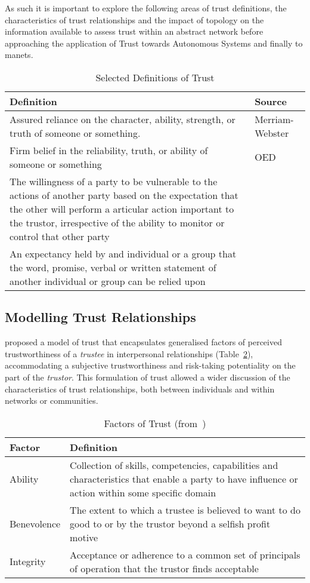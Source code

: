 As such it is important to explore the following areas of trust definitions, the characteristics of trust relationships and the impact of topology on the information available to assess trust within an abstract network before approaching the application of Trust towards Autonomous Systems and finally to \glspl{manet}.
%
\begin{table}[h]
  \centering
  \caption{Selected Definitions of Trust}
  \label{tab:trust_definitions}
  \begin{tabularx}{\textwidth}{X p{3cm}}\toprule
    Definition & Source \\ \midrule
    Assured reliance on the character, ability, strength, or truth of someone or something.
    & Merriam-Webster\\
    Firm belief in the reliability, truth, or ability of someone or something & OED\\
    The willingness of a party to be vulnerable to the actions of another party based on the expectation that the other will perform a articular action important to the trustor, irrespective of the ability to monitor or control that other party &~\citet{Mayer1995} \\
    An expectancy held by and individual or a group that the word, promise, verbal or written statement of another individual or group can be relied upon &~\citet{Rotter1967}\\\bottomrule
  \end{tabularx}
\end{table}
%

\subsection{Modelling Trust Relationships}
\citet{Mayer1995} proposed a model of trust that encapsulates generalised factors of perceived trustworthiness of a \textit{trustee} in interpersonal relationships (Table~\ref{tab:trust_factors}), accommodating a subjective trustworthiness and risk-taking potentiality on the part of the \textit{trustor}.
This formulation of trust allowed a wider discussion of the characteristics of trust relationships, both between individuals and within networks or communities.

\begin{table}[h]
  \centering
  \caption[Factors of Trust]{Factors of Trust (from~\citet{Mayer1995})}
  \label{tab:trust_factors}
  \begin{tabularx}{\textwidth}{p{2cm}X}\toprule
    Factor & Definition \\ \midrule
    Ability & Collection of skills, competencies, capabilities and characteristics that enable a party to have influence or action within some specific domain \\
    Benevolence & The extent to which a trustee is believed to want to do good to or by the trustor beyond a selfish profit motive\\
    Integrity & Acceptance or adherence to a common set of principals of operation that the trustor finds acceptable\\
    \bottomrule
  \end{tabularx}
\end{table}

